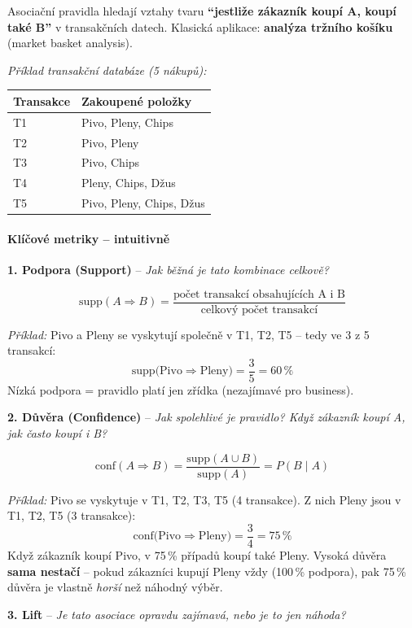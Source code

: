 Asociační pravidla hledají vztahy tvaru \textbf{``jestliže zákazník koupí A, koupí také B''}
v transakčních datech. Klasická aplikace: \textbf{analýza tržního košíku} (market basket analysis).

\textit{Příklad transakční databáze (5 nákupů):}
\begin{center}\footnotesize
\begin{tabular}{ll}
\toprule
\textbf{Transakce} & \textbf{Zakoupené položky} \\
\midrule
T1 & Pivo, Pleny, Chips \\
T2 & Pivo, Pleny \\
T3 & Pivo, Chips \\
T4 & Pleny, Chips, Džus \\
T5 & Pivo, Pleny, Chips, Džus \\
\bottomrule
\end{tabular}
\end{center}

\paragraph{Klíčové metriky -- intuitivně}

\textbf{1. Podpora (Support)} -- \textit{Jak běžná je tato kombinace celkově?}

$$\text{supp}(A \Rightarrow B) = \frac{\text{počet transakcí obsahujících A i B}}{\text{celkový počet transakcí}}$$

\textit{Příklad:} Pivo a Pleny se vyskytují společně v T1, T2, T5 -- tedy ve 3 z 5 transakcí:
$$\text{supp(Pivo} \Rightarrow \text{Pleny)} = \frac{3}{5} = 60\,\%$$
Nízká podpora = pravidlo platí jen zřídka (nezajímavé pro business).

\medskip
\textbf{2. Důvěra (Confidence)} -- \textit{Jak spolehlivé je pravidlo? Když zákazník koupí A, jak často koupí i B?}

$$\text{conf}(A \Rightarrow B) = \frac{\text{supp}(A \cup B)}{\text{supp}(A)} = P(B \mid A)$$

\textit{Příklad:} Pivo se vyskytuje v T1, T2, T3, T5 (4 transakce). Z nich Pleny jsou v T1, T2, T5 (3 transakce):
$$\text{conf(Pivo} \Rightarrow \text{Pleny)} = \frac{3}{4} = 75\,\%$$
Když zákazník koupí Pivo, v 75\,\% případů koupí také Pleny.
Vysoká důvěra \textbf{sama nestačí} -- pokud zákazníci kupují Pleny vždy (100\,\% podpora),
pak 75\,\% důvěra je vlastně \textit{horší} než náhodný výběr.

\medskip
\textbf{3. Lift} -- \textit{Je tato asociace opravdu zajímavá, nebo je to jen náhoda?}


